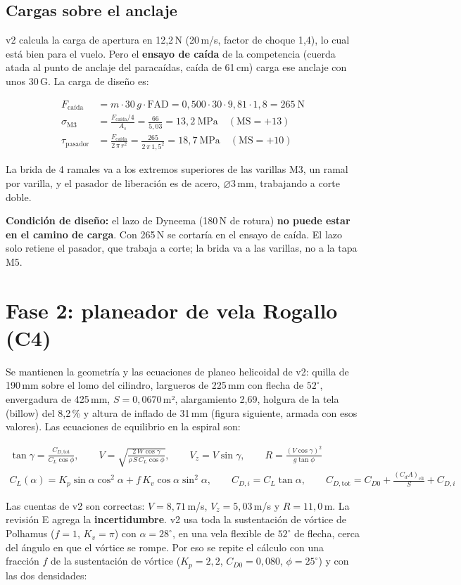 \documentclass[10pt,a4paper]{article}
\newcommand{\diam}{\ensuremath{\varnothing}}
\newcommand{\pend}[1]{\textcolor{rojo}{\bfseries #1}}
\begin{document}
\subsection{Cargas sobre el anclaje}
v2 calcula la carga de apertura en 12,2\,N (20\,m/s, factor de choque 1,4), lo cual está bien para el vuelo. Pero el
\textbf{ensayo de caída} de la competencia (cuerda atada al punto de anclaje del paracaídas, caída de 61\,cm) carga ese anclaje con
unos 30\,G. La carga de diseño es:
\begin{ecu}
\begin{align}
F_\mathrm{caída} &= m\cdot 30\,g\cdot \mathrm{FAD} = 0{,}500\cdot 30\cdot 9{,}81\cdot 1{,}8 = 265~\mathrm{N}\\
\sigma_\mathrm{M3} &= \frac{F_\mathrm{caída}/4}{A_s} = \frac{66}{5{,}03} = 13{,}2~\mathrm{MPa}\quad(\mathrm{MS} = +13)\\
\tau_\mathrm{pasador} &= \frac{F_\mathrm{caída}}{2\,\pi\,r^2} = \frac{265}{2\,\pi\,1{,}5^2} = 18{,}7~\mathrm{MPa}\quad(\mathrm{MS} = +10)
\end{align}
\end{ecu}
La brida de 4 ramales va a los extremos superiores de las varillas M3, un ramal por varilla, y el pasador de liberación es de acero, \diam3\,mm,
trabajando a corte doble.

\pend{Condición de diseño:} el lazo de Dyneema (180\,N de rotura) \textbf{no puede estar en el camino de carga}. Con 265\,N se
cortaría en el ensayo de caída. El lazo solo retiene el pasador, que trabaja a corte; la brida va a las varillas, no a la tapa M5.

\section{Fase 2: planeador de vela Rogallo (C4)}
Se mantienen la geometría y las ecuaciones de planeo helicoidal de v2: quilla de 190\,mm sobre el lomo del cilindro, largueros de
225\,mm con flecha de $52^\circ$, envergadura de 425\,mm, $S = 0{,}0670$\,m², alargamiento 2,69, holgura de la tela (billow) del
8,2\,\% y altura de inflado de 31\,mm (figura siguiente, armada con esos valores). Las ecuaciones de equilibrio en la
espiral son:
\begin{ecu}
\begin{gather}
\tan\gamma = \frac{C_{D,\mathrm{tot}}}{C_L\cos\phi},\qquad
V = \sqrt{\frac{2\,W\cos\gamma}{\rho\,S\,C_L\cos\phi}},\qquad V_z = V\sin\gamma,\qquad R = \frac{(V\cos\gamma)^2}{g\tan\phi}\\
C_L(\alpha) = K_p\sin\alpha\cos^2\alpha + f\,K_v\cos\alpha\sin^2\alpha,\qquad C_{D,i} = C_L\tan\alpha,\qquad
C_{D,\mathrm{tot}} = C_{D0} + \frac{(C_d A)_\mathrm{cil}}{S} + C_{D,i}
\end{gather}
\end{ecu}
Las cuentas de v2 son correctas: $V = 8{,}71$\,m/s, $V_z = 5{,}03$\,m/s y $R = 11{,}0$\,m. La revisión E agrega la
\textbf{incertidumbre}. v2 usa toda la sustentación de vórtice de Polhamus ($f = 1$, $K_v = \pi$) con $\alpha = 28^\circ$, en una
vela flexible de $52^\circ$ de flecha, cerca del ángulo en que el vórtice se rompe. Por eso se repite el cálculo con una fracción
$f$ de la sustentación de vórtice ($K_p = 2{,}2$, $C_{D0} = 0{,}080$, $\phi = 25^\circ$) y con las dos densidades:
\end{document}
